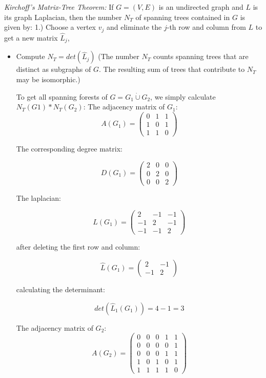 \documentclass[
]{article}
\begin{document}
\emph{Kirchoff's Matrix-Tree Theorem:} If \(G=(V,E)\) is an undirected
graph and \(L\) is its graph Laplacian, then the number \(N_T\) of
spanning trees contained in \(G\) is given by: 1.) Choose a vertex
\(v_j\) and eliminate the \(j\)-th row and column from \(L\) to get a
new matrix \(\hat L_j\),

\begin{itemize}
\item
  Compute \(N_T = det(\hat L_j)\) (The number \(N_T\) counts spanning
  trees that are distinct as subgraphs of \(G\). The resulting sum of
  trees that contribute to \(N_T\) may be isomorphic.)

  To get all spanning forests of \(G = G_1 \dot \cup G_2\), we simply
  calculate \(N_T(G1) * N_T (G_2)\): The adjacency matrix of \(G_1\):
  \[A(G_1) = \begin{pmatrix}
    0 & 1 & 1\\
    1 & 0 & 1\\
    1 & 1 & 0
    \end{pmatrix}\]

  The corresponding degree matrix:

  \[D(G_1) = \begin{pmatrix}
    2 & 0 & 0\\
    0 & 2 & 0\\
    0 & 0 & 2
    \end{pmatrix}\]

  The laplacian:

  \[L(G_1) = \begin{pmatrix}
    2 & -1 & -1\\
    -1 & 2 & -1\\
    -1 & -1 & 2
    \end{pmatrix}\]

  after deleting the first row and column:

  \[\hat L(G_1) = \begin{pmatrix}
    2 & -1\\
    -1 & 2
    \end{pmatrix}\]

  calculating the determinant:

  \[ 
    det(\hat L_1(G_1)) = 4 - 1 = 3
    \]

  The adjacency matrix of \(G_2\): \[A(G_2) = \begin{pmatrix}
    0 & 0 & 0 & 1 & 1\\
    0 & 0 & 0 & 0 & 1\\
    0 & 0 & 0 & 1 & 1\\
    1 & 0 & 1 & 0 & 1\\
    1 & 1 & 1 & 1 & 0
    \end{pmatrix}\]


\end{itemize}
\end{document}
